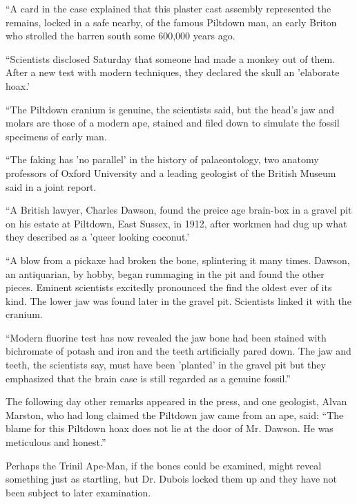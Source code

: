 ``A card in the case explained that this plaster cast assembly represented the remains, locked
in a safe nearby, of the famous Piltdown man, an early Briton who strolled the barren south
some 600,000 years ago.

``Scientists disclosed Saturday that someone had made a monkey out of them. After a new
test with modern techniques, they declared the skull an 'elaborate hoax.'

``The Piltdown cranium is genuine, the scientists said, but the head's jaw and molars are those
of a modern ape, stained and filed down to simulate the fossil specimens of early man.

``The faking has 'no parallel' in the history of palaeontology, two anatomy professors of
Oxford University and a leading geologist of the British Museum said in a joint report.

``A British lawyer, Charles Dawson, found the preice age brain-box in a gravel pit on his
estate at Piltdown, East Sussex, in 1912, after workmen had dug up what they described as a
'queer looking coconut.'

``A blow from a pickaxe had broken the bone, splintering it many times. Dawson, an
antiquarian, by hobby, began rummaging in the pit and found the other pieces. Eminent
scientists excitedly pronounced the find the oldest ever of its kind. The lower jaw was found
later in the gravel pit. Scientists linked it with the cranium.

``Modern fluorine test has now revealed the jaw bone had been stained with bichromate of
potash and iron and the teeth artificially pared down. The jaw and teeth, the scientists say,
must have been 'planted' in the gravel pit but they emphasized that the brain case is still
regarded as a genuine fossil.''

The following day other remarks appeared in the press, and one geologist, Alvan Marston,
who had long claimed the Piltdown jaw came from an ape, said: ``The blame for this
Piltdown hoax does not lie at the door of Mr. Dawson. He was meticulous and honest.''

Perhaps the Trinil Ape-Man, if the bones could be examined, might reveal something just as
startling, but Dr. Dubois locked them up and they have not been subject to later examination.

